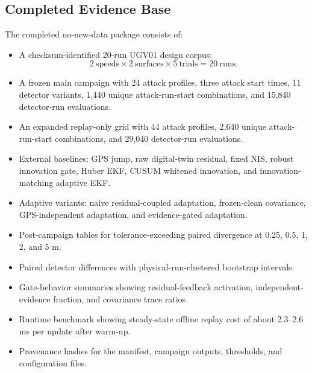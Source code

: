 \subsection{Completed Evidence Base}

The completed no-new-data package consists of:

\begin{itemize}
    \item A checksum-identified 20-run UGV01 design corpus:
    \[
        2\ \text{speeds} \times 2\ \text{surfaces} \times
        5\ \text{trials}=20\ \text{runs}.
    \]

    \item A frozen main campaign with 24 attack profiles, three attack start
    times, 11 detector variants, 1,440 unique attack-run-start combinations,
    and 15,840 detector-run evaluations.

    \item An expanded replay-only grid with 44 attack profiles, 2,640 unique
    attack-run-start combinations, and 29,040 detector-run evaluations.

    \item External baselines: GPS jump, raw digital-twin residual, fixed NIS,
    robust innovation gate, Huber EKF, CUSUM whitened innovation, and
    innovation-matching adaptive EKF.

    \item Adaptive variants: naive residual-coupled adaptation, frozen-clean
    covariance, GPS-independent adaptation, and evidence-gated adaptation.

    \item Post-campaign tables for tolerance-exceeding paired divergence at
    0.25, 0.5, 1, 2, and 5 m.

    \item Paired detector differences with physical-run-clustered bootstrap
    intervals.

    \item Gate-behavior summaries showing residual-feedback activation,
    independent-evidence fraction, and covariance trace ratios.

    \item Runtime benchmark showing steady-state offline replay cost of about
    2.3--2.6 ms per update after warm-up.

    \item Provenance hashes for the manifest, campaign outputs, thresholds,
    and configuration files.
\end{itemize}

